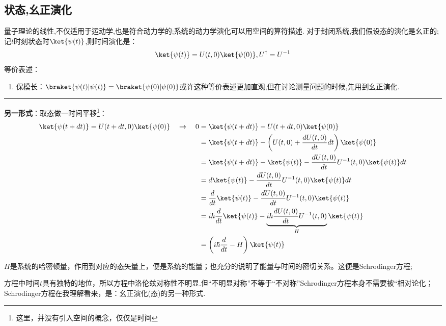 \newpage

\subsection{状态,幺正演化}
量子理论的线性,不仅适用于运动学,也是符合动力学的;系统的动力学演化可以用空间的算符描述.
   对于封闭系统,我们假设态的演化是幺正的;记$t$时刻状态时$\ket{\psi(t)}$,则时间演化是：
   \begin{equation}
    \ket{\psi(t)}=U(t,0)\ket{\psi(0)},U^\dagger=U^{-1}
   \end{equation}
   等价表述：\begin{enumerate}
    \item 保模长：$\braket{\psi(t)|\psi(t)}=\braket{\psi(0)|\psi(0)}$或许这种等价表述更加直观,但在讨论测量问题的时候,先用到幺正演化.
\end{enumerate}
    \par\vspace{2ex}
    \hrule
    \vspace{2ex}
   \textbf{另一形式}：取态做一时间平移\footnote{这里，并没有引入空间的概念，仅仅是时间}：
   \begin{equation}
    \begin{aligned}
        \ket{\psi(t+dt)}=U(t+dt,0)\ket{\psi(0)}\quad
        \to \quad0&=\ket{\psi(t+dt)}-U(t+dt,0)\ket{\psi(0)}
        \\&=
        \ket{\psi(t+dt)}-\left(U(t,0)+\frac{dU(t,0)}{dt}dt \right)\ket{\psi(0)}
        \\&=
        \ket{\psi(t+dt)}-\ket{\psi(t)}-\frac{dU(t,0)}{dt}U^{-1}(t,0)\ket{\psi(t)}dt
        \\&=
        d\ket{\psi(t)}-\frac{dU(t,0)}{dt}U^{-1}(t,0)\ket{\psi(t)}dt
        \\&=
        \frac{d}{dt}\ket{\psi(t)}-\frac{dU(t,0)}{dt}U^{-1}(t,0)\ket{\psi(t)}
        \\&=
        i\hbar\frac{d}{dt}\ket{\psi(t)}-
        \underbrace{i\hbar\frac{dU(t,0)}{dt}U^{-1}(t,0)}_{H}\ket{\psi(t)}
        \\&=\left(i\hbar\frac{d}{dt}-H\right)\ket{\psi(t)}
    \end{aligned}
   \end{equation}

\begin{tcolorbox}[colback=white!5,colframe=black!45]
$H$是系统的哈密顿量，作用到对应的态矢量上，便是系统的能量；也充分的说明了能量与时间的密切关系。这便是Schrodinger方程;
\vspace{2ex}\par
方程中时间$t$具有独特的地位，所以方程中洛伦兹对称性不明显.但“不明显对称”不等于“不对称”Schrodinger方程本身不需要被“相对论化；Schrodinger方程在我理解看来，是：幺正演化(态)的另一种形式.
\end{tcolorbox}

